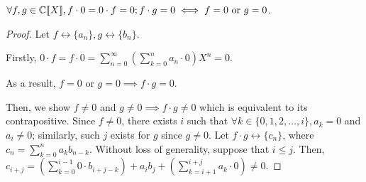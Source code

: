 \documentclass[a4paper, 12pt]{report}
\begin{document}
\begin{prop}\label{prop:gf-mult-0}
$\forall f, g \in \mathbb{C}\llbracket X\rrbracket, f \cdot 0 = 0 \cdot f = 0; f \cdot g = 0 \iff f = 0 \text{ or } g = 0$.
\end{prop}
\begin{proof}
Let $f \longleftrightarrow \{a_n\}, g \longleftrightarrow \{b_n\}$. 

Firstly, $0 \cdot f = f \cdot 0 = \sum_{n = 0}^\infty \left(\sum_{k = 0}^n a_n \cdot 0\right)X^n = 0$.

As a result, $f = 0$ or $g = 0 \implies f \cdot g = 0$.

Then, we show $f \neq 0$ and $g \neq 0 \implies f \cdot g \neq 0$ which is equivalent to its contrapositive. Since $f \neq 0$, there exists $i$ such that $\forall k\in \{0, 1, 2, \dots, i\}, a_{k} = 0$ and $a_i \neq 0$; similarly, such $j$ exists for $g$ since $g \neq 0$. Let $f \cdot g \longleftrightarrow \{c_n\}$, where $c_n = \sum_{k = 0}^n a_k b_{n - k}$. Without loss of generality, suppose that $i \leq j$. Then, $c_{i + j} = (\sum_{k = 0}^{i - 1} 0 \cdot b_{i + j - k}) + a_i b_j + (\sum_{k = i + 1}^{i + j} a_{k} \cdot 0)\neq 0$.
\end{proof}
\end{document}
